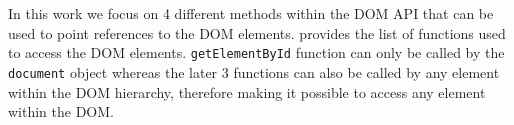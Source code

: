 	
	In this work we focus on 4 different methods within the DOM API that can be used to point references to the DOM elements.  provides the list of functions used to access the DOM elements. \texttt{getElementById} function can only be called by the \texttt{document} object whereas the later 3 functions can also be called by any element within the DOM hierarchy, therefore making it possible to access any element within the DOM.
	
	
	